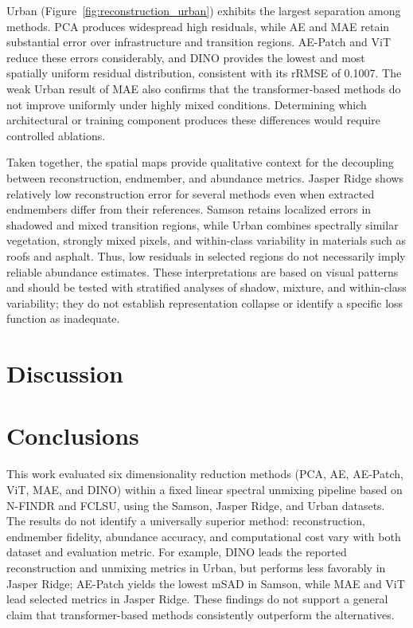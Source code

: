 \documentclass{article}
\begin{document}
Urban (Figure~\ref{fig:reconstruction_urban}) exhibits the largest separation among methods. PCA produces widespread high residuals, while AE and MAE retain substantial error over infrastructure and transition regions. AE-Patch and ViT reduce these errors considerably, and DINO provides the lowest and most spatially uniform residual distribution, consistent with its rRMSE of 0.1007. The weak Urban result of MAE also confirms that the transformer-based methods do not improve uniformly under highly mixed conditions. Determining which architectural or training component produces these differences would require controlled ablations.

Taken together, the spatial maps provide qualitative context for the decoupling between reconstruction, endmember, and abundance metrics. Jasper Ridge shows relatively low reconstruction error for several methods even when extracted endmembers differ from their references. Samson retains localized errors in shadowed and mixed transition regions, while Urban combines spectrally similar vegetation, strongly mixed pixels, and within-class variability in materials such as roofs and asphalt. Thus, low residuals in selected regions do not necessarily imply reliable abundance estimates. These interpretations are based on visual patterns and should be tested with stratified analyses of shadow, mixture, and within-class variability; they do not establish representation collapse or identify a specific loss function as inadequate.

\section{Discussion}
\label{sec:discussion}




\section{Conclusions}
\label{sec:conclusions}

This work evaluated six dimensionality reduction methods (PCA, AE, AE-Patch, ViT, MAE, and DINO) within a fixed linear spectral unmixing pipeline based on N-FINDR and FCLSU, using the Samson, Jasper Ridge, and Urban datasets. The results do not identify a universally superior method: reconstruction, endmember fidelity, abundance accuracy, and computational cost vary with both dataset and evaluation metric. For example, DINO leads the reported reconstruction and unmixing metrics in Urban, but performs less favorably in Jasper Ridge; AE-Patch yields the lowest mSAD in Samson, while MAE and ViT lead selected metrics in Jasper Ridge. These findings do not support a general claim that transformer-based methods consistently outperform the alternatives.
\end{document}
